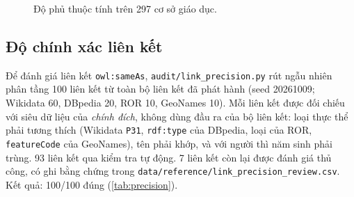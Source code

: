 \documentclass[12pt,a4paper]{article}
\begin{document}
\begin{figure}[htbp]
\centering
{}
\caption{Độ phủ thuộc tính trên 297 cơ sở giáo dục.}\label{fig:coverage}
\end{figure}

\subsection{Độ chính xác liên kết}
Để đánh giá liên kết \texttt{owl:sameAs}, \texttt{audit/link\_precision.py} rút ngẫu nhiên phân tầng 100 liên kết từ
toàn bộ liên kết đã phát hành (seed 20261009; Wikidata 60, DBpedia 20, ROR 10, GeoNames 10). Mỗi liên kết được đối chiếu
với siêu dữ liệu của \emph{chính đích}, không dùng đầu ra của bộ liên kết: loại thực thể phải tương thích (Wikidata
\texttt{P31}, \texttt{rdf:type} của DBpedia, loại của ROR, \texttt{featureCode} của GeoNames), tên phải khớp, và với
người thì năm sinh phải trùng. 93 liên kết qua kiểm tra tự động. 7 liên kết còn lại được đánh giá thủ công, có ghi bằng
chứng trong \texttt{data/reference/link\_precision\_review.csv}. Kết quả: 100/100 đúng (\cref{tab:precision}).
\end{document}
